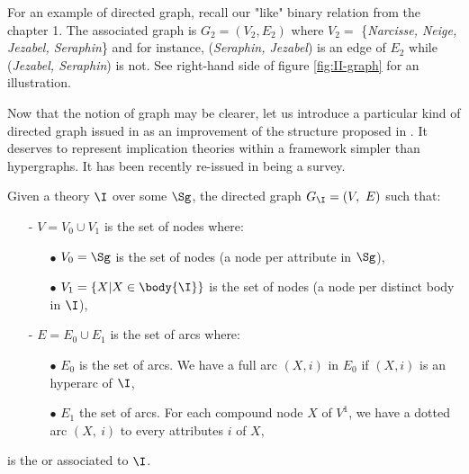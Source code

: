 For an example of directed graph, recall our "like" binary relation from the
chapter 1. The associated graph is $G_2 = (V_2, E_2)$ where $V_2 = $ 
\{\textit{Narcisse, Neige, Jezabel, Seraphin}\} and for instance, 
(\textit{Seraphin, Jezabel}) is an edge of $E_2$ while (\textit{Jezabel, 
Seraphin}) is not. See right-hand side of figure \ref{fig:II-graph} for an 
illustration.

\vspace{1.2em}

Now that the notion of graph may be clearer, let us introduce a particular
kind of directed graph issued in \cite{ausiello_graph_1983, 
ausiello_minimal_1986} as an improvement of the structure proposed in 
\cite{ausiello_graph_1980}. It deserves to represent implication theories within
a framework simpler than hypergraphs. It has been recently re-issued in 
\cite{ausiello_directed_2017} being a survey.

\begin{definition} Given a theory $\I$ over some $\Sg$, 
the directed graph $G_{\I} = (V, \  E)$ such that:
\begin{itemize}
	\item[-] $V = V_0 \cup V_1$ is the set of nodes where:
	\begin{itemize}
		\item[$\bullet$] $V_0 = \Sg$ is the set of  nodes (a node
		per attribute in $\Sg$),
		\item[$\bullet$] $V_1 = \{X | X \in \body{\I} \}$ is the set of 
		 nodes (a node per distinct body in $\I$),
	\end{itemize}
	
	\item[-] $E = E_0 \cup E_1$ is the set of arcs where:
	\begin{itemize}
		\item[$\bullet$] $E_0$ is the set of  arcs. We have a full arc $(X, i)$ in	$E_0$ if $(X, i)$ is an hyperarc of $\I$,
		\item[$\bullet$] $E_1$ the set of  arcs. For each compound node $X$ of $V^1$, we have a dotted arc $(X, \ i)$ to every attributes $i$ of $X$,
	\end{itemize}
	
\end{itemize}
\noindent is the  or  
associated to $\I$.
\end{definition}


